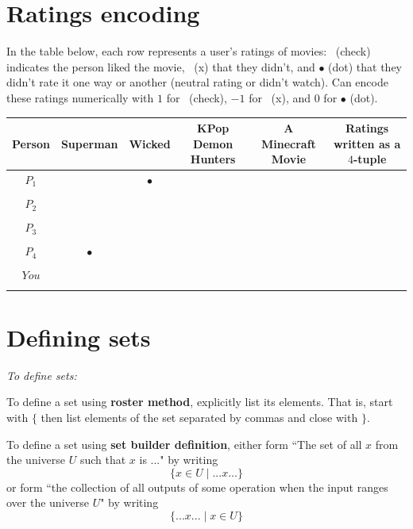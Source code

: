 \documentclass[12pt, oneside]{article}
\newcommand{\cmark}{\ding{51}}
\newcommand{\xmark}{\ding{55}}
\begin{document}
\begin{flushright}
\end{flushright} \section*{Ratings encoding}


In the table  below,  each row represents a user's ratings of movies: 
\cmark~(check) indicates the person liked the movie, \xmark~(x)
that they didn't, and $\bullet$ (dot) that they didn't rate it one way or 
another (neutral rating or didn't watch). Can encode
these ratings numerically with $1$ for \cmark~(check), $-1$ for \xmark~(x), 
and $0$ for $\bullet$ (dot).

\vfill

\begin{center}
\begin{tabular}{c|cccc||c}
Person & Superman & Wicked & KPop Demon Hunters & A Minecraft Movie & Ratings written as a $4$-tuple\\
\hline
$P_1$     & \xmark & $\bullet$ & \cmark & \phantom{$(-1, 0, 1, 1)$} \\
&&&& \\
$P_2$     & \cmark & \cmark & \xmark & \phantom{$(1, 1, -1, 1)$} \\
&&&& \\
$P_3$     & \cmark & \cmark & \cmark & \phantom{$(1, 1, 1, 1)$} \\
&&&& \\
$P_4$     & $\bullet$ & \xmark & \cmark &  \\
&&&& \\
$You$     &  &  &  &  \\
&&&& \\
\end{tabular}
\end{center} \vfill
\section*{Defining sets}


{\it To define sets:}

To define a set using {\bf roster method}, explicitly list its elements. That is,
start with $\{$ then list elements of 
the set separated by commas and close with $\}$.

\vfill

To define a set using {\bf set builder definition}, either form 
``The set of all $x$ from the universe $U$ such that $x$ is ..." by writing
\[\{x \in U \mid ...x... \}\]
or form ``the collection of all outputs of some operation when the input ranges over the universe $U$"
by writing
\[\{ ...x... \mid x\in U \}\]
\end{document}
